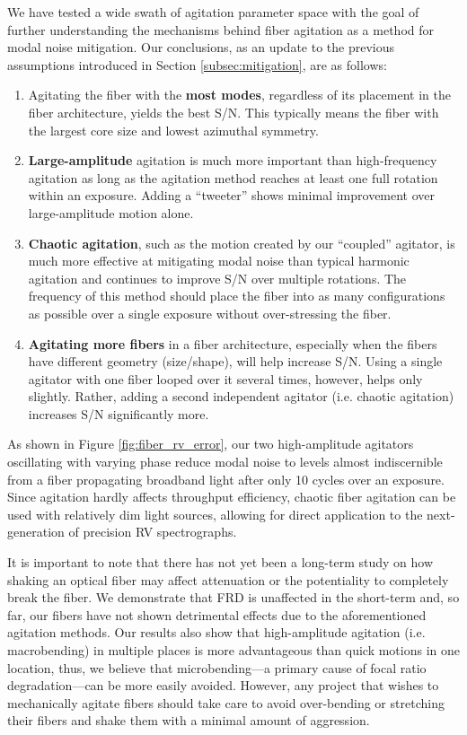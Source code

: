 We have tested a wide swath of agitation parameter space with the goal of further understanding the mechanisms behind fiber agitation as a method for modal noise mitigation. Our conclusions, as an update to the previous assumptions introduced in Section \ref{subsec:mitigation}, are as follows:
\begin{enumerate}
\item Agitating the fiber with the \textbf{most modes}, regardless of its placement in the fiber architecture, yields the best S/N. This typically means the fiber with the largest core size and lowest azimuthal symmetry.
\item \textbf{Large-amplitude} agitation is much more important than high-frequency agitation as long as the agitation method reaches at least one full rotation within an exposure. Adding a ``tweeter'' shows minimal improvement over large-amplitude motion alone.
\item \textbf{Chaotic agitation}, such as the motion created by our ``coupled'' agitator, is much more effective at mitigating modal noise than typical harmonic agitation and continues to improve S/N over multiple rotations. The frequency of this method should place the fiber into as many configurations as possible over a single exposure without over-stressing the fiber.
\item \textbf{Agitating more fibers} in a fiber architecture, especially when the fibers have different geometry (size/shape), will help increase S/N. Using a single agitator with one fiber looped over it several times, however, helps only slightly. Rather, adding a second independent agitator (i.e. chaotic agitation) increases S/N significantly more.
\end{enumerate}

As shown in Figure \ref{fig:fiber_rv_error}, our two high-amplitude agitators oscillating with varying phase reduce modal noise to levels almost indiscernible from a fiber propagating broadband light after only 10 cycles over an exposure. Since agitation hardly affects throughput efficiency, chaotic fiber agitation can be used with relatively dim light sources, allowing for direct application to the next-generation of precision RV spectrographs.

It is important to note that there has not yet been a long-term study on how shaking an optical fiber may affect attenuation or the potentiality to completely break the fiber. We demonstrate that FRD is unaffected in the short-term and, so far, our fibers have not shown detrimental effects due to the aforementioned agitation methods. Our results also show that high-amplitude agitation (i.e. macrobending) in multiple places is more advantageous than quick motions in one location, thus, we believe that microbending---a primary cause of focal ratio degradation---can be more easily avoided. However, any project that wishes to mechanically agitate fibers should take care to avoid over-bending or stretching their fibers and shake them with a minimal amount of aggression.

